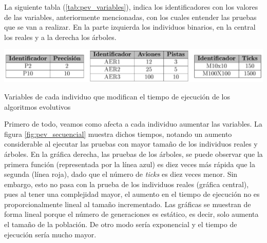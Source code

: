 		La siguiente tabla (\ref{tab:pev_variables}), indica los identificadores con los valores de las variables, anteriormente mencionadas, con los cuales entender las pruebas que se van a realizar. En la parte izquierda los individuos binarios, en la central los reales y a la derecha los árboles.
		
		\begin{table}[!h]
			\centering
			\includegraphics[width=1\textwidth]{images/chapter_4/tab_pev_variables}		
			\caption{Variables de cada individuo que modifican el tiempo de ejecución de los algoritmos evolutivos}
			\label{tab:pev_variables}
		\end{table}		
	
			
		Primero de todo, veamos como afecta a cada individuo aumentar las variables. La figura \ref{fig:pev_secuencial} muestra dichos tiempos, notando un aumento considerable al ejecutar las pruebas con mayor tamaño de los individuos reales y árboles. En la gráfica derecha, las pruebas de los árboles, se puede observar que la primera función (representada por la línea azul) es diez veces más rápida que la segunda (línea roja), dado que el número de \textit{ticks} es diez veces menor. Sin embargo, esto no pasa con la prueba de los individuos reales (gráfica central), pues al tener una complejidad mayor, el aumento en el tiempo de ejecución no es proporcionalmente lineal al tamaño incrementado. Las gráficas se muestran de forma lineal porque el número de generaciones es estático, es decir, solo aumenta el tamaño de la población. De otro modo sería exponencial y el tiempo de ejecución sería mucho mayor.
	

	
	
